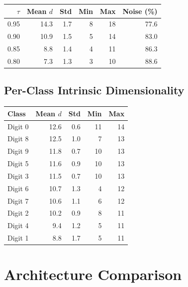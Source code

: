 \documentclass[11pt,letterpaper]{article}
\begin{document}
\begin{tabular}{@{}rrrrrr@{}}
\toprule
$\tau$ & Mean $d$ & Std & Min & Max & Noise (\%) \\
\midrule
  0.95 & 14.3 & 1.7 & 8 & 18 & 77.6 \\
  0.90 & 10.9 & 1.5 & 5 & 14 & 83.0 \\
  0.85 & 8.8 & 1.4 & 4 & 11 & 86.3 \\
  0.80 & 7.3 & 1.3 & 3 & 10 & 88.6 \\
\bottomrule
\end{tabular}

\subsection{Per-Class Intrinsic Dimensionality}

\begin{tabular}{@{}lrrrr@{}}
\toprule
Class & Mean $d$ & Std & Min & Max \\
\midrule
  Digit 0 & 12.6 & 0.6 & 11 & 14 \\
  Digit 8 & 12.5 & 1.0 & 7 & 13 \\
  Digit 9 & 11.8 & 0.7 & 10 & 13 \\
  Digit 5 & 11.6 & 0.9 & 10 & 13 \\
  Digit 3 & 11.5 & 0.7 & 10 & 13 \\
  Digit 6 & 10.7 & 1.3 & 4 & 12 \\
  Digit 7 & 10.6 & 1.1 & 6 & 12 \\
  Digit 2 & 10.2 & 0.9 & 8 & 11 \\
  Digit 4 & 9.4 & 1.2 & 5 & 11 \\
  Digit 1 & 8.8 & 1.7 & 5 & 11 \\
\bottomrule
\end{tabular}

\section{Architecture Comparison}
\end{document}
